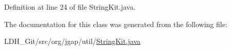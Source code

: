 Definition at line 24 of file String\-Kit.\-java.



The documentation for this class was generated from the following file\-:\begin{DoxyCompactItemize}
\item 
L\-D\-H\-\_\-\-Git/src/org/jgap/util/\hyperlink{_string_kit_8java}{String\-Kit.\-java}\end{DoxyCompactItemize}

